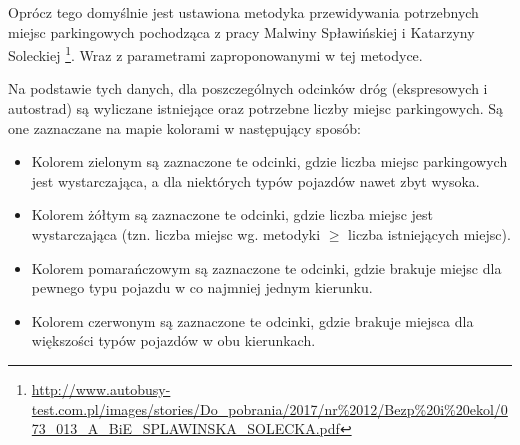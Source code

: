 \documentclass[10pt,paper=a4 BCOR0, DIV15, titlepage=false, oneside]{scrbook} %
\begin{document}
    Oprócz tego domyślnie jest ustawiona metodyka przewidywania potrzebnych
    miejsc parkingowych pochodząca z pracy Malwiny Spławińskiej i Katarzyny
    Soleckiej
    \footnote{\url{http://www.autobusy-test.com.pl/images/stories/Do_pobrania/2017/nr\%2012/Bezp\%20i\%20ekol/073_013_A_BiE_SPLAWINSKA_SOLECKA.pdf}}.
        Wraz z parametrami zaproponowanymi w tej metodyce.

    Na podstawie tych danych, dla poszczególnych odcinków dróg (ekspresowych i
    autostrad) są wyliczane istniejące oraz potrzebne liczby miejsc
    parkingowych. Są one zaznaczane na mapie kolorami w następujący sposób:
    \begin{itemize}
      \item Kolorem zielonym są zaznaczone te odcinki, gdzie liczba miejsc
        parkingowych jest wystarczająca, a dla niektórych typów pojazdów nawet
        zbyt wysoka.
      \item Kolorem żółtym są zaznaczone te odcinki, gdzie liczba miejsc jest
        wystarczająca (tzn. liczba miejsc wg. metodyki $\ge$ liczba istniejących
        miejsc).
      \item Kolorem pomarańczowym są zaznaczone te odcinki, gdzie brakuje
        miejsc dla pewnego typu pojazdu w co najmniej jednym kierunku.
      \item Kolorem czerwonym są zaznaczone te odcinki, gdzie brakuje miejsca
        dla większości typów pojazdów w obu kierunkach.
     \end{itemize}
\end{document}
